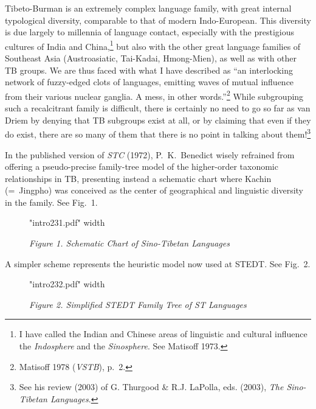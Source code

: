 \begin{itemize}
Tibeto-Burman is an extremely complex language family, with great internal
typological diversity, comparable to that of modern Indo-European.  This
diversity is due largely to millennia of language contact, especially with the
prestigious cultures of India and China,\footnote{I have called the Indian and
Chinese areas of linguistic and cultural influence the \textit{Indosphere} and the
\textit{Sinosphere}. See Matisoff 1973.} but also with the other
great language families of Southeast Asia (Austroasiatic, Tai-Kadai,
Hmong-Mien), as well as with other TB groups.  We are thus faced with what I
have described as “an interlocking network of fuzzy-edged clots of languages,
emitting waves of mutual influence from their various nuclear ganglia.  A mess,
in other words.”\footnote{Matisoff 1978 (\textit{VSTB}), p.~2.}  While subgrouping such
a recalcitrant family is difficult, there is certainly no need to go so far as
van Driem by denying that TB subgroups exist at all, or by claiming that even if
they do exist, there are so many of them that there is no point in talking about
them!\footnote{See his review (2003) of G. Thurgood \& R.J. LaPolla, eds. (2003),
\textit{The Sino-Tibetan Languages}.}


In the published version of \textit{STC} (1972),
P.\ K.\ Benedict wisely refrained from offering a pseudo-precise family-tree model of
the higher-order taxonomic relationships in TB, presenting instead a schematic
chart where Kachin (=~Jingpho) was conceived as the center of geographical and
linguistic diversity in the family.  See Fig.~1.

\begin{figure}[ht]
\XeTeXpdffile "intro231.pdf"  width \textwidth
\begin{center}
\textit{Figure 1. Schematic Chart of Sino-Tibetan Languages}\footnotemark
\end{center}
\end{figure}

A simpler scheme represents the heuristic model now used at STEDT.  See Fig.~2.

\begin{figure}[ht]
\XeTeXpdffile "intro232.pdf"  width \textwidth
\begin{center}
\textit{Figure 2.  Simplified STEDT Family Tree of ST Languages}
\end{center}
\end{figure}


\end{itemize}
